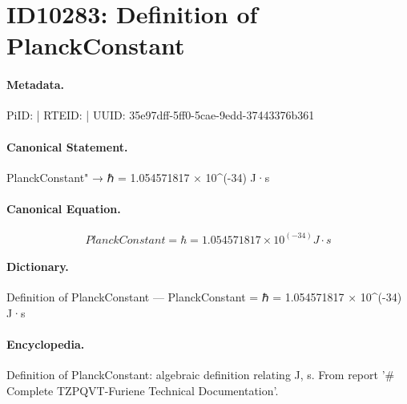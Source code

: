 \section*{ID10283: Definition of PlanckConstant}
\paragraph{Metadata.}
PiID:  | RTEID:  | UUID: 35e97dff-5ff0-5cae-9edd-37443376b361

\paragraph{Canonical Statement.}
PlanckConstant" → ℏ = 1.054571817 × 10\textasciicircum{}(-34) J·s

\paragraph{Canonical Equation.}
\[
PlanckConstant = ℏ = 1.054571817 × 10^(-34) J·s
\]

\paragraph{Dictionary.}
Definition of PlanckConstant — PlanckConstant = ℏ = 1.054571817 × 10\textasciicircum{}(-34) J·s

\paragraph{Encyclopedia.}
Definition of PlanckConstant: algebraic definition relating J, s. From report '\# Complete TZPQVT-Furiene Technical Documentation'.
